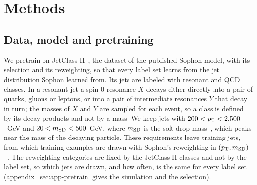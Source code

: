 \section{Methods}\label{sec:methods}

\subsection{Data, model and pretraining}\label{sec:data}

We pretrain on JetClass-II~\cite{sophon,jetclasstwo}, the dataset of the published Sophon model, with its
selection and its reweighting, so that every label set learns from the jet distribution Sophon learned from.
Its jets are labeled with \LitJetClassTwoNResonantClasses{} resonant and \LitJetClassTwoNQcdClasses{} QCD
classes. In a resonant jet a spin-0 resonance $X$ decays either directly into a pair of quarks, gluons or
leptons, or into a pair of intermediate resonances $Y$ that decay in turn; the masses of $X$ and $Y$ are sampled
for each event, so a class is defined by its decay products and not by a mass. We keep jets with
$200 < p_{\mathrm T} < 2{,}500$~GeV and $20 < m_{\mathrm{SD}} < 500$~GeV, where $m_{\mathrm{SD}}$ is
the soft-drop mass~\cite{softdrop}, which peaks near the mass of the decaying particle. These requirements leave
\DesignNTrainSelected{} training jets, from which training examples are drawn with Sophon's reweighting in %
$(p_{\mathrm T}, m_{\mathrm{SD}})$~\cite[Sec.~II]{sophon}. The reweighting categories are fixed by the JetClass-II classes
and not by the label set, so which jets are drawn, and how often, is the same for every label set
(appendix~\ref{sec:app-pretrain} gives the simulation and the selection).

